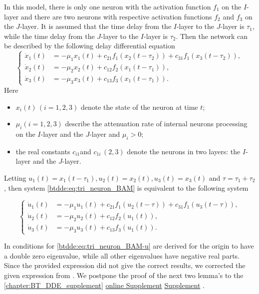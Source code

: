 In this model, there is only one neuron with the activation function
$f_{1}$ on the $I$-layer and there are two neurons with respective
activation functions $f_{2}$ and $f_{3}$ on the $J$-layer. It is assumed 
that the time delay from the $I$-layer to the $J$-layer is $\tau_{1}$,
while the time delay from the $J$-layer to the $I$-layer is $\tau_{2}$.
Then the network can be described by the following delay differential equation
\begin{equation}
\label{btdde:eq:tri_neuron_BAM}
\begin{cases}
\dot{x}_{1}(t) & =-\mu_{1}x_{1}(t)+c_{21}f_{1}(x_{2}(t-\tau_{2}))+c_{31}f_{1}(x_{3}(t-\tau_{2})),\\
\dot{x}_{2}(t) & =-\mu_{2}x_{2}(t)+c_{12}f_{2}(x_{1}(t-\tau_{1})),\\
\dot{x}_{3}(t) & =-\mu_{3}x_{3}(t)+c_{13}f_{3}(x_{1}(t-\tau_{1})).
\end{cases}
\end{equation}
Here
\begin{itemize}
\item $x_{i}(t)\,(i=1,2,3)$ denote the state of the neuron at time $t$;
\item $\mu_{i}(i=1,2,3)$ describe the attenuation rate of internal neurons
processing on the $I$-layer and the $J$-layer and $\mu_{i}>0$;
\item the real constants $c_{i1}$and $c_{1i}\,(2,3)$ denote the neurons
in two layers: the $I$-layer and the $J$-layer.
\end{itemize}
Letting $u_{1}(t)=x_{1}(t-\tau_{1}),u_{2}(t)=x_{2}(t),u_{3}(t)=x_{3}(t)$
and $\tau=\tau_{1}+\tau_{2}$, then system \cref{btdde:eq:tri_neuron_BAM}
is equivalent to the following system

\begin{equation}
\label{btdde:eq:tri_neuron_BAM-u}
\begin{cases}
\dot{u}_{1}(t) & =-\mu_{1}u_{1}(t)+c_{21}f_{1}(u_{2}(t-\tau))+c_{31}f_{1}(u_{3}(t-\tau)),\\
\dot{u}_{2}(t) & =-\mu_{2}u_{2}(t)+c_{12}f_{2}(u_{1}(t)),\\
\dot{u}_{3}(t) & =-\mu_{3}u_{3}(t)+c_{13}f_{3}(u_{1}(t)).
\end{cases}
\end{equation}

In \cite{dong2013bogdanov} conditions for \cref{btdde:eq:tri_neuron_BAM-u} are derived
for the origin to have a double zero eigenvalue, while all other eigenvalues
have negative real parts. Since the provided expression did not give the correct results,
we corrected the given expression from \cite{dong2013bogdanov}.
We postpone the proof of the next two lemma's to the 
\ifthesis%
    \cref{chapter:BT_DDE_supplement}%
\fi%
\ifsiam%
    \hyperref[mysupplement]{online Supplement}%
\fi%
\ifarxiv%
    \hyperlink{mysupplement}{Supplement}%
\fi.

